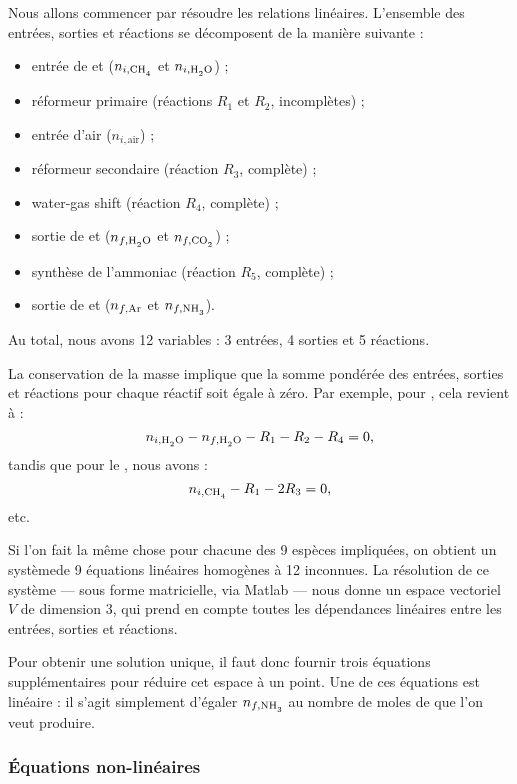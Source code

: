 Nous allons commencer par résoudre les relations linéaires. L'ensemble des entrées, sorties et réactions se décomposent de la manière suivante :
\begin{itemize}
  \item entrée de  et  ($n_{i,\ce{CH4}}$ et $n_{i,\ce{H2O}}$) ;
  \item réformeur primaire (réactions $R_1$ et $R_2$, incomplètes) ;
  \item entrée d'air ($n_{i,\text{air}}$) ;
  \item réformeur secondaire (réaction $R_3$, complète) ;
  \item water-gas shift (réaction $R_4$, complète) ;
  \item sortie de  et  ($n_{f,\ce{H2O}}$ et $n_{f,\ce{CO2}}$) ;
  \item synthèse de l'ammoniac (réaction $R_5$, complète) ;
  \item sortie de  et  ($n_{f,\ce{Ar}}$ et $n_{f,\ce{NH3}}$).
\end{itemize}
Au total, nous avons 12 variables : 3 entrées, 4 sorties et 5 réactions.

La conservation de la masse implique que la somme pondérée des entrées, sorties et réactions pour chaque réactif soit égale à zéro. Par exemple, pour , cela revient à :
\[
  n_{i,\ce{H2O}} - n_{f,\ce{H2O}} - R_1 - R_2 - R_4 = 0
  \text,
\]
tandis que pour le , nous avons :
\[
  n_{i,\ce{CH4}} - R_1 - 2R_3 = 0
  \text,
\]
etc.

Si l'on fait la même chose pour chacune des 9 espèces impliquées, on obtient un système\footnotemark de 9 équations linéaires homogènes à 12 inconnues. La résolution de ce système --- sous forme matricielle, via Matlab --- nous donne un espace vectoriel $V$ de dimension 3, qui prend en compte toutes les dépendances linéaires entre les entrées, sorties et réactions.

Pour obtenir une solution unique, il faut donc fournir trois équations supplémentaires pour réduire cet espace à un point. Une de ces équations est linéaire : il s'agit simplement d'égaler $n_{f,\ce{NH3}}$ au nombre de moles de  que l'on veut produire.

\subsubsection{Équations non-linéaires}

